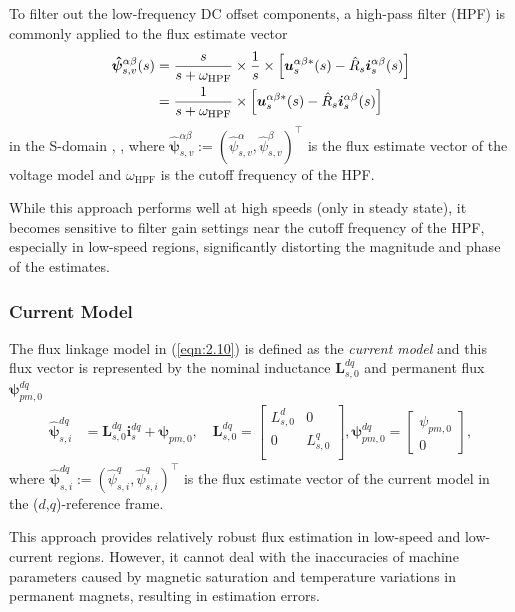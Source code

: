 To filter out the low-frequency DC offset components, a high-pass filter (HPF) is commonly applied to the flux estimate vector
\begin{align}\notag
\bm{\hat{\psi}}^{\alpha\beta}_{s,v}(s) &= \frac{s}{s + \omega_\text{HPF}} \times \frac{1}{s}\times\left[  \bm{u}^{\alpha\beta*}_{s}(s) - \hat{R}_s \bm{i}^{\alpha\beta}_{s}(s)\right]\\\label{eqn:2.37}
&= \frac{1}{s + \omega_\text{HPF}} \times \left[  \bm{u}^{\alpha\beta*}_{s}(s) - \hat{R}_s \bm{i}^{\alpha\beta}_s(s)\right]
\end{align}
in the S-domain \cite{c2.3_9}, \cite{c2.3_10}, where \(\bm{\hat{\psi}}^{\alpha\beta}_{s,{v}}:=(\hat{\psi}^{\alpha}_{s,{v}},\hat{\psi}^{\beta}_{s,{v}})^\top\) is the flux estimate vector of the voltage model and \(\omega_{\text{HPF}}\) is the cutoff frequency of the HPF.

While this approach performs well at high speeds (only in steady state), it becomes sensitive to filter gain settings near the cutoff frequency of the HPF, especially in low-speed regions, significantly distorting the magnitude and phase of the estimates.

\subsubsection{Current Model}
The flux linkage model in (\ref{eqn:2.10}) is defined as the \emph{current model} \cite{c2.1_1} and this flux vector is represented by the nominal inductance $\mathbf{{L}}^{dq}_{s,0}$ and permanent flux $\bm{{\psi}}^{dq}_{pm,0}$
\begin{align}\label{eqn:2.31}
\bm{\hat{\psi}}^{dq}_{s,i} &= \mathbf{{L}}^{dq}_{s,0}\mathbf{i}^{dq}_s
+ \bm\psi_{pm,0}, \quad 
 \mathbf{{L}}^{dq}_{s,0} = \begin{bmatrix}
{L}^d_{s,0} & 0 \\
0 & {L}^q_{s,0} \\
\end{bmatrix}, {\bm{{\psi}}^{dq}_{pm,0} = \begin{bmatrix}
{\psi_{pm,0}} \\
0
\end{bmatrix}},
\end{align}
where \(\bm{\hat{\psi}}^{dq}_{s,{i}}:=(\hat{\psi}^{q}_{s,{i}},\hat{\psi}^{q}_{s,{i}})^\top\) is the flux estimate vector of the current model in the ($d$,$q$)-reference frame.

This approach provides relatively robust flux estimation in low-speed and low-current regions. However, it cannot deal with the inaccuracies of machine parameters caused by magnetic saturation and temperature variations in permanent magnets, resulting in estimation errors.

